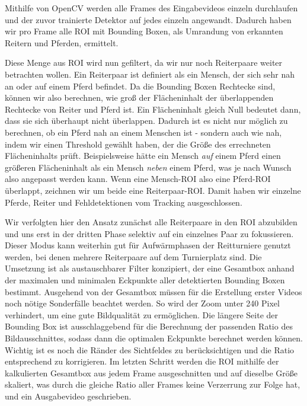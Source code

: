 Mithilfe von OpenCV werden alle Frames des Eingabevideos einzeln durchlaufen und der zuvor trainierte Detektor auf jedes einzeln angewandt. Dadurch haben wir pro Frame alle ROI mit Bounding Boxen, als Umrandung von erkannten Reitern und Pferden, ermittelt. 

Diese Menge aus ROI wird nun gefiltert, da wir nur noch Reiterpaare weiter betrachten wollen. Ein Reiterpaar ist definiert als ein Mensch, der sich sehr nah an oder auf einem Pferd befindet.
Da die Bounding Boxen Rechtecke sind, können wir also berechnen, wie groß der Flächeninhalt der überlappenden Rechtecke von Reiter und Pferd ist. Ein Flächeninhalt gleich Null bedeutet dann, dass sie sich überhaupt nicht überlappen.
Dadurch ist es nicht nur möglich zu berechnen, ob ein Pferd nah an einem Menschen ist - sondern auch wie nah, indem wir einen Threshold gewählt haben, der die Größe des errechneten Flächeninhalts prüft. Beispielsweise hätte ein Mensch \emph{auf} einem Pferd einen größeren Flächeninhalt als ein Mensch \emph{neben} einem Pferd, was je nach Wunsch also angepasst werden kann.
Wenn eine Mensch-ROI also eine Pferd-ROI überlappt, zeichnen wir um beide eine Reiterpaar-ROI. Damit haben wir einzelne Pferde, Reiter und Fehldetektionen vom Tracking ausgeschlossen.

Wir verfolgten hier den Ansatz zunächst alle Reiterpaare in den ROI abzubilden und uns erst in der dritten Phase selektiv auf ein einzelnes Paar zu fokussieren. Dieser Modus kann weiterhin gut für Aufwärmphasen der Reitturniere genutzt werden, bei denen mehrere Reiterpaare auf dem Turnierplatz sind. Die Umsetzung ist als austauschbarer Filter konzipiert, der eine Gesamtbox anhand der maximalen und minimalen Eckpunkte aller detektierten Bounding Boxen bestimmt.
Ausgehend von der Gesamtbox müssen für die Erstellung erster Videos noch nötige Sonderfälle beachtet werden. So wird der Zoom unter 240 Pixel verhindert, um eine gute Bildqualität zu ermöglichen. Die längere Seite der Bounding Box ist ausschlaggebend für die Berechnung der passenden Ratio des Bildausschnittes, sodass dann die optimalen Eckpunkte berechnet werden können. Wichtig ist es noch die Ränder des Sichtfeldes zu berücksichtigen und die Ratio entsprechend zu korrigieren.
Im letzten Schritt werden die ROI mithilfe der kalkulierten Gesamtbox aus jedem Frame ausgeschnitten und auf dieselbe  Größe skaliert, was durch die gleiche Ratio aller Frames keine Verzerrung zur Folge hat, und ein Ausgabevideo geschrieben.





